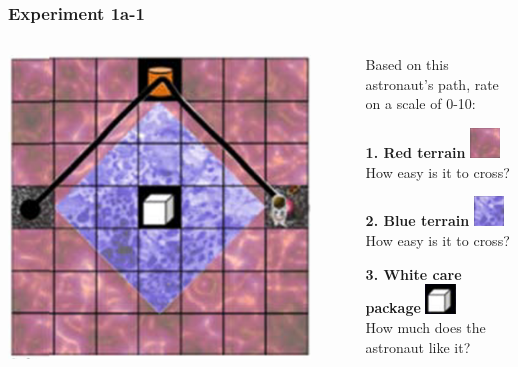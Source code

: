 \documentclass{beamer}
\begin{document}
\begin{frame}
    \frametitle{Experiment 1a-1}
    \begin{columns}
    \begin{column}{0.5\textwidth}
    \begin{center}
    \includegraphics[width=0.9\textwidth]{experiment_1a-1.png}
    \end{center}
    \end{column}
    \begin{column}{0.5\textwidth}
    Based on this astronaut's path, rate on a scale of 0-10:
    
    \vspace{0.2cm}
    \textbf{1. Red terrain} \includegraphics[width=0.8cm]{red_terrain.png}\\
    How easy is it to cross?
    \vspace{0.2cm}
    
    \textbf{2. Blue terrain} \includegraphics[width=0.8cm]{blue_terrain.png}\\
    How easy is it to cross?
    \vspace{0.2cm}
    
    \textbf{3. White care package} \includegraphics[width=0.8cm]{white_carepackage.png}\\
    How much does the astronaut like it?
    \vspace{0.2cm}
    

\end{column}
\end{columns}
\end{frame}
\end{document}
